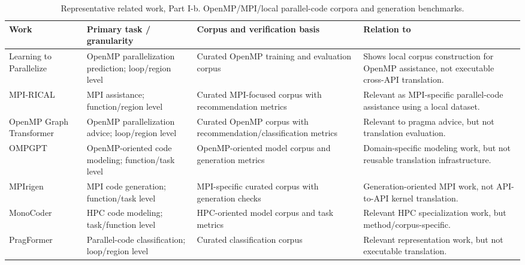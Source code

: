 \begin{table}[p]
\centering
\caption{
Representative related work, Part I-b. OpenMP/MPI/local parallel-code corpora and generation benchmarks.
}
\label{tab:related-work-b}
\scriptsize
\setlength{\tabcolsep}{3.2pt}
\renewcommand{\arraystretch}{1.05}
\begin{tabularx}{\textwidth}{@{}
>{\RaggedRight\arraybackslash}p{}
>{\RaggedRight\arraybackslash}p{}
>{\RaggedRight\arraybackslash}p{}
>{\RaggedRight\arraybackslash}X
@{}}
\toprule
Work & Primary task / granularity & Corpus and verification basis & Relation to \parbench{} \\
\midrule

Learning to Parallelize~\cite{LearningToParallelize2023}
& OpenMP parallelization prediction; loop/region level
& Curated OpenMP training and evaluation corpus
& Shows local corpus construction for OpenMP assistance, not executable cross-API translation. \\

MPI-RICAL~\cite{MPIRICAL2023}
& MPI assistance; function/region level
& Curated MPI-focused corpus with recommendation metrics
& Relevant as MPI-specific parallel-code assistance using a local dataset. \\

OpenMP Graph Transformer~\cite{OMPify2023}
& OpenMP parallelization advice; loop/region level
& Curated OpenMP corpus with recommendation/classification metrics
& Relevant to pragma advice, but not translation evaluation. \\

OMPGPT~\cite{OMPGPT2024}
& OpenMP-oriented code modeling; function/task level
& OpenMP-oriented model corpus and generation metrics
& Domain-specific modeling work, but not reusable translation infrastructure. \\

MPIrigen~\cite{MPIrigen2024}
& MPI code generation; function/task level
& MPI-specific curated corpus with generation checks
& Generation-oriented MPI work, not API-to-API kernel translation. \\

MonoCoder~\cite{MonoCoder2024}
& HPC code modeling; task/function level
& HPC-oriented model corpus and task metrics
& Relevant HPC specialization work, but method/corpus-specific. \\

PragFormer~\cite{PragFormer2025}
& Parallel-code classification; loop/region level
& Curated classification corpus
& Relevant representation work, but not executable translation. \\


\end{tabularx}
\end{table}
